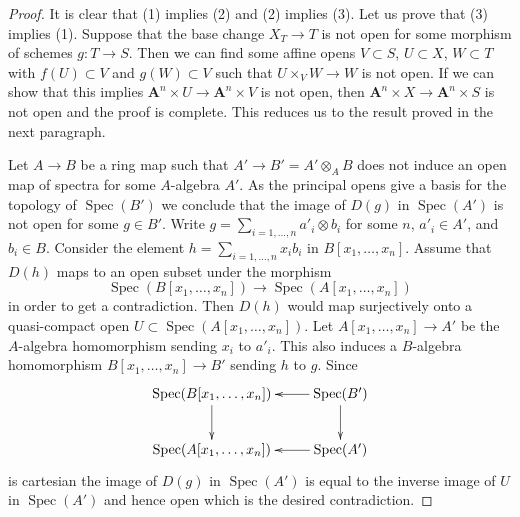 \documentclass[10pt,a4paper]{amsart}
\theoremstyle{plain}
\theoremstyle{definition}
\theoremstyle{remark}
\numberwithin{equation}{subsection}
\def\Spec{\mathop{\mathrm{Spec}}}
\begin{document}
\begin{proof}
It is clear that (1) implies (2) and (2) implies (3).
Let us prove that (3) implies (1).
Suppose that the base change $X_T \to T$ is not open
for some morphism of schemes $g : T \to S$.
Then we can find some affine opens
$V \subset S$, $U \subset X$, $W \subset T$
with $f(U) \subset V$ and $g(W) \subset V$
such that $U \times_V W \to W$ is not open.
If we can show that this implies
$\mathbf{A}^n \times U \to \mathbf{A}^n \times V$
is not open, then $\mathbf{A}^n \times X \to \mathbf{A}^n \times S$
is not open and the proof is complete. This reduces us
to the result proved in the next paragraph.

\medskip\noindent
Let $A \to B$ be a ring map such that $A' \to B' = A' \otimes_A B$
does not induce an open map of spectra for some $A$-algebra $A'$.
As the principal opens give a basis for the topology of $\Spec(B')$
we conclude that the image of $D(g)$ in $\Spec(A')$
is not open for some $g \in B'$. Write
$g = \sum_{i = 1, \ldots, n} a'_i \otimes b_i$
for some $n$, $a'_i \in A'$, and $b_i \in B$.
Consider the element $h = \sum_{i = 1, \ldots, n} x_i b_i$
in $B[x_1, \ldots, x_n]$. Assume that $D(h)$ maps to
an open subset under the morphism
$$
\Spec(B[x_1, \ldots, x_n]) \longrightarrow \Spec(A[x_1, \ldots, x_n])
$$
in order to get a contradiction. Then $D(h)$ would map surjectively
onto a quasi-compact open $U \subset \Spec(A[x_1, \ldots, x_n])$.
Let $A[x_1, \ldots, x_n] \to A'$ be the $A$-algebra homomorphism
sending $x_i$ to $a'_i$. This also induces a $B$-algebra
homomorphism $B[x_1, \ldots, x_n] \to B'$ sending $h$ to $g$.
Since
$$
\xymatrix{
\Spec(B[x_1, \ldots, x_n]) \ar[d] &
\Spec(B') \ar[l] \ar[d] \\
\Spec(A[x_1, \ldots, x_n]) &
\Spec(A') \ar[l]
}
$$
is cartesian the image of $D(g)$ in $\Spec(A')$ is equal to the
inverse image of $U$ in $\Spec(A')$ and hence open which is
the desired contradiction.
\end{proof}
\end{document}
